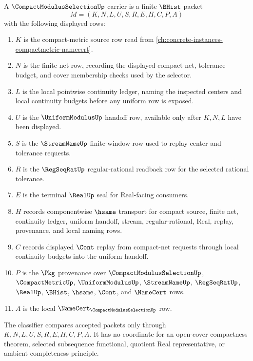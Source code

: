 \begin{definition}
\label{def:compact-modulus-selection-carrier}
A $\CompactModulusSelectionUp$ carrier is a finite $\BHist$ packet
$$
M=(K,N,L,U,S,R,E,H,C,P,A)
$$
with the following displayed rows:
\begin{enumerate}
\item $K$ is the compact-metric source row read from \autoref{ch:concrete-instances-compactmetric-namecert}.
\item $N$ is the finite-net row, recording the displayed compact net, tolerance budget, and cover membership checks used by the selector.
\item $L$ is the local pointwise continuity ledger, naming the inspected centers and local continuity budgets before any uniform row is exposed.
\item $U$ is the $\UniformModulusUp$ handoff row, available only after $K,N,L$ have been displayed.
\item $S$ is the $\StreamNameUp$ finite-window row used to replay center and tolerance requests.
\item $R$ is the $\RegSeqRatUp$ regular-rational readback row for the selected rational tolerance.
\item $E$ is the terminal $\RealUp$ seal for Real-facing consumers.
\item $H$ records componentwise $\hsame$ transport for compact source, finite net, continuity ledger, uniform handoff, stream, regular-rational, Real, replay, provenance, and local naming rows.
\item $C$ records displayed $\Cont$ replay from compact-net requests through local continuity budgets into the uniform handoff.
\item $P$ is the $\Pkg$ provenance over $\CompactModulusSelectionUp$, $\CompactMetricUp$, $\UniformModulusUp$, $\StreamNameUp$, $\RegSeqRatUp$, $\RealUp$, $\BHist$, $\hsame$, $\Cont$, and $\NameCert$ rows.
\item $A$ is the local $\NameCert_{\CompactModulusSelectionUp}$ row.
\end{enumerate}
The classifier compares accepted packets only through $K,N,L,U,S,R,E,H,C,P,A$. It has no coordinate for an open-cover compactness theorem, selected subsequence functional, quotient Real representative, or ambient completeness principle.
\end{definition}

